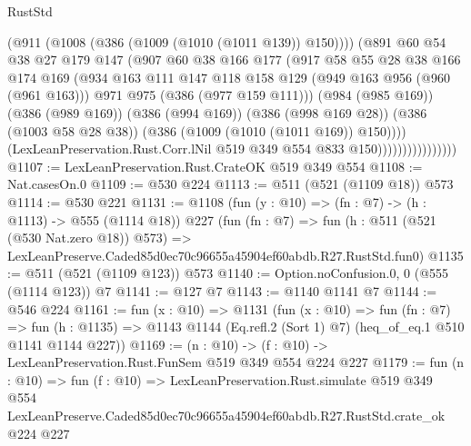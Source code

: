 \begin{lexlean}{RustStd}
\begin{coremodule}
                                (@911 (@1008 (@386 (@1009 (@1010 (@1011 @139)) @150))))
                                (@891
                                  @60
                                  @54
                                  @38
                                  @27
                                  @179
                                  @147
                                  (@907
                                    @60
                                    @38
                                    @166
                                    @177
                                    (@917
                                      @58
                                      @55
                                      @28
                                      @38
                                      @166
                                      @174
                                      @169
                                      (@934
                                        @163
                                        @111
                                        @147
                                        @118
                                        @158
                                        @129
                                        (@949 @163 @956 (@960 (@961 @163)))
                                        @971
                                        @975
                                        (@386 (@977 @159 @111)))
                                      (@984 (@985 @169))
                                      (@386 (@989 @169))
                                      (@386 (@994 @169))
                                      (@386 (@998 @169 @28))
                                      (@386 (@1003 @58 @28 @38))
                                      (@386 (@1009 (@1010 (@1011 @169)) @150))))
                                  (LexLeanPreservation.Rust.Corr.lNil
                                    @519
                                    @349
                                    @554
                                    @833
                                    @150))))))))))))))))
@1107 := LexLeanPreservation.Rust.CrateOK @519 @349 @554
@1108 := Nat.casesOn.{0}
@1109 := @530 @224
@1113 := @511 (@521 (@1109 @18)) @573
@1114 := @530 @221
@1131 := @1108
    (fun (y : @10) => (fn : @7) -> (h : @1113) -> @555 (@1114 @18))
    @227
    (fun (fn : @7) =>
    fun (h : @511 (@521 (@530 Nat.zero @18)) @573) =>
    LexLeanPreserve.Caded85d0ec70c96655a45904ef60abdb.R27.RustStd.fun0)
@1135 := @511 (@521 (@1109 @123)) @573
@1140 := Option.noConfusion.{0, 0} (@555 (@1114 @123)) @7
@1141 := @127 @7
@1143 := @1140 @1141 @7
@1144 := @546 @224
@1161 := fun (x : @10) =>
  @1131
    (fun (x : @10) =>
    fun (fn : @7) =>
    fun (h : @1135) => @1143 @1144 (Eq.refl.{2} (Sort 1) @7) (heq_of_eq.{1} @510 @1141 @1144 @227))
@1169 := (n : @10) -> (f : @10) -> LexLeanPreservation.Rust.FunSem @519 @349 @554 @224 @227
@1179 := fun (n : @10) =>
  fun (f : @10) =>
  LexLeanPreservation.Rust.simulate
    @519
    @349
    @554
    LexLeanPreserve.Caded85d0ec70c96655a45904ef60abdb.R27.RustStd.crate_ok
    @224
    @227
\end{coremodule}
\end{lexlean}
